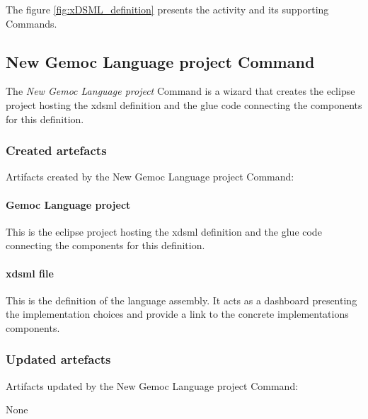 \documentclass{gemoc} %
\begin{document}
The figure \ref{fig:xDSML_definition} presents the activity and its supporting Commands.

\subsection{New Gemoc Language project Command}
The \emph{New Gemoc Language project} Command is a wizard that creates the eclipse project hosting the xdsml definition and the glue code connecting the components for this definition.
\subsubsection{Created artefacts}
Artifacts created by the New Gemoc Language project Command:
\paragraph{Gemoc Language project} 
This is the eclipse project hosting the xdsml definition and the glue code connecting the components for this definition.\paragraph{xdsml file} 
This is the definition of the language assembly. It acts as a dashboard presenting the implementation choices and provide a link to the concrete implementations components.
\subsubsection{Updated artefacts}
Artifacts updated by the New Gemoc Language project Command:

	None
\end{document}
